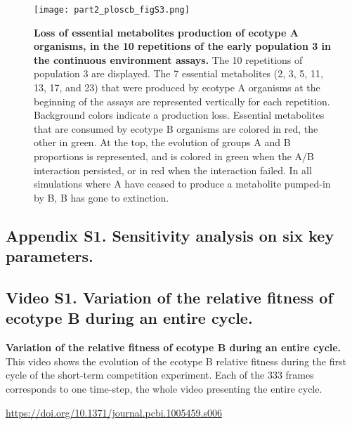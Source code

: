 \begin{figure}[!h]
\begin{center}
\texttt{[image: part2\_ploscb\_figS3.png]}
\end{center}
\caption[Loss of essential metabolites production of ecotype A organisms, in the 10 repetitions of the early population 3 in the continuous environment assays.]{{\bf Loss of essential metabolites production of ecotype A organisms, in the 10 repetitions of the early population 3 in the continuous environment assays.} The 10 repetitions of population 3 are displayed. The 7 essential metabolites (2, 3, 5, 11, 13, 17, and 23) that were produced by ecotype A organisms at the beginning of the assays are represented vertically for each repetition. Background colors indicate a production loss. Essential metabolites that are consumed by ecotype B organisms are colored in red, the other in green. At the top, the evolution of groups A and B proportions is represented, and is colored in green when the A/B interaction persisted, or in red when the interaction failed. In all simulations where A have ceased to produce a metabolite pumped-in by B, B has gone to extinction.}
\end{figure}

\newpage


\subsection{Appendix S1. Sensitivity analysis on six key parameters.}
\label{appendix:part2:first_result:S1_Appendix}



\newpage


\subsection{Video S1. Variation of the relative fitness of ecotype B during an entire cycle.}
\label{video:part2:first_result:S1_Video}
{\bf Variation of the relative fitness of ecotype B during an entire cycle.} This video shows the evolution of the ecotype B relative fitness during the first cycle of the short-term competition experiment. Each of the 333 frames corresponds to one time-step, the whole video presenting the entire cycle.

\begin{center}
\href{https://doi.org/10.1371/journal.pcbi.1005459.s006}{https://doi.org/10.1371/journal.pcbi.1005459.s006}
\end{center}

